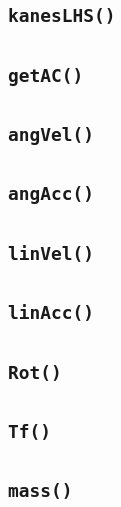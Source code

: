 \documentclass[a4paper,10pt]{article}
\begin{document}
\subsection{\texttt{kanesLHS()}}


\subsection{\texttt{getAC()}}


\subsection{\texttt{angVel()}}


\subsection{\texttt{angAcc()}}


\subsection{\texttt{linVel()}}


\subsection{\texttt{linAcc()}}


\subsection{\texttt{Rot()}}


\subsection{\texttt{Tf()}}


\subsection{\texttt{mass()}}

\end{document}
